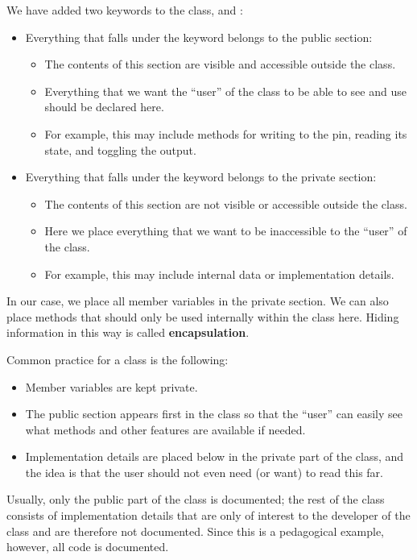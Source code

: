 \noindent We have added two keywords to the class,  and :
\begin{itemize}
  \item Everything that falls under the keyword  belongs to the public section:
  \begin{itemize}
    \item The contents of this section are visible and accessible outside the class.
    \item Everything that we want the ``user'' of the class to be able to see and use should be
      declared here.
    \item For example, this may include methods for writing to the pin, reading its state, and
      toggling the output.
  \end{itemize}
  \item Everything that falls under the keyword  belongs to the private section:
  \begin{itemize}
    \item The contents of this section are not visible or accessible outside the class.
    \item Here we place everything that we want to be inaccessible to the ``user'' of the class.
    \item For example, this may include internal data or implementation details.
  \end{itemize}
\end{itemize}
In our case, we place all member variables in the private section. We can also place methods that
should only be used internally within the class here. Hiding information in this way is called
\textbf{encapsulation}.

Common practice for a class is the following:
\begin{itemize}
  \item Member variables are kept private.
  \item The public section appears first in the class so that the ``user'' can easily see what
    methods and other features are available if needed.
  \item Implementation details are placed below in the private part of the class, and the idea is
    that the user should not even need (or want) to read this far.
\end{itemize}
Usually, only the public part of the class is documented; the rest of the class consists of
implementation details that are only of interest to the developer of the class and are therefore
not documented. Since this is a pedagogical example, however, all code is documented.

